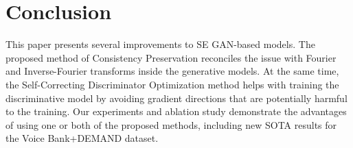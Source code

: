 \documentclass{article}
\begin{document}
\begin{table}[t]
    \centering
    \caption{\textbf{Ablation Study on Voice Bank + DEMAND:} STOI results are equal to 0.96 for all the tests;  - results from our tests; ND - Noisy Data, CP - Consistency Preserving method, SC - SC with  and , SC - SC with , , .}
    \label{tab:abs_study}
\end{table}


\section{Conclusion}\label{sec:conclusion}
This paper presents several improvements to SE GAN-based models. The proposed method of Consistency Preservation reconciles the issue with Fourier and Inverse-Fourier transforms inside the generative models. At the same time, the Self-Correcting Discriminator Optimization method helps with training the discriminative model by avoiding gradient directions that are potentially harmful to the training. Our experiments and ablation study demonstrate the advantages of using one or both of the proposed methods, including new SOTA results for the Voice Bank+DEMAND dataset.



\clearpage


\end{document}
